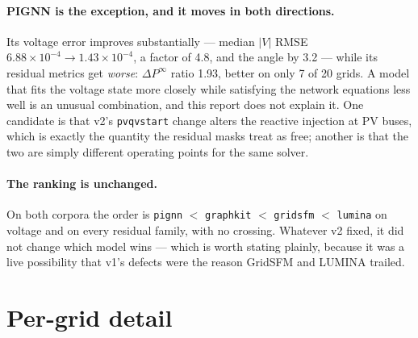 \documentclass[10pt]{article}
\begin{document}
\paragraph{PIGNN is the exception, and it moves in both directions.} Its voltage
error improves substantially --- median $|V|$ RMSE $6.88\times10^{-4} \to
1.43\times10^{-4}$, a factor of 4.8, and the angle by 3.2 --- while its residual
metrics get \emph{worse}: $\Delta P^{\infty}$ ratio 1.93, better on only 7 of 20
grids. A model that fits the voltage state more closely while satisfying the
network equations less well is an unusual combination, and this report does not
explain it. One candidate is that v2's \texttt{pvqvstart} change alters the
reactive injection at PV buses, which is exactly the quantity the residual masks
treat as free; another is that the two are simply different operating points for
the same solver.

\paragraph{The ranking is unchanged.} On both corpora the order is
\texttt{pignn} $<$ \texttt{graphkit} $<$ \texttt{gridsfm} $<$ \texttt{lumina} on
voltage and on every residual family, with no crossing. Whatever v2 fixed, it
did not change which model wins --- which is worth stating plainly, because it
was a live possibility that v1's defects were the reason GridSFM and LUMINA
trailed.

\section{Per-grid detail}
\end{document}
